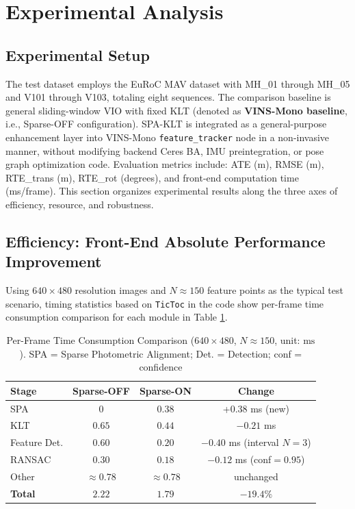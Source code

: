\documentclass[journal,twoside,web]{ieeecolor}
\begin{document}
\section{Experimental Analysis}
\label{sec:experiment}

\subsection{Experimental Setup}

The test dataset employs the EuRoC MAV dataset \cite{burri2016euroc} with MH\_01 through MH\_05 and V101 through V103, totaling eight sequences. The comparison baseline is general sliding-window VIO with fixed KLT (denoted as \textbf{VINS-Mono baseline}, i.e., Sparse-OFF configuration). SPA-KLT is integrated as a general-purpose enhancement layer into VINS-Mono \texttt{feature\_tracker} node in a non-invasive manner, without modifying backend Ceres BA, IMU preintegration, or pose graph optimization code. Evaluation metrics include: ATE (m), RMSE (m), RTE\_trans (m), RTE\_rot (degrees), and front-end computation time (ms/frame). This section organizes experimental results along the three axes of efficiency, resource, and robustness.

\subsection{Efficiency: Front-End Absolute Performance Improvement}

Using $640\times480$ resolution images and $N\approx150$ feature points as the typical test scenario, timing statistics based on \texttt{TicToc} in the code show per-frame time consumption comparison for each module in Table \ref{tab:time_breakdown}.

\begin{table}[!t]
\centering
\caption{Per-Frame Time Consumption Comparison ($640\times480$, $N\approx150$, unit: $\mathrm{ms}$). SPA = Sparse Photometric Alignment; Det. = Detection; conf = confidence}
\label{tab:time_breakdown}
\begin{tabular}{|l|c|c|c|}
\hline
Stage & \multicolumn{1}{c|}{Sparse-OFF} & \multicolumn{1}{c|}{Sparse-ON} & \multicolumn{1}{c|}{Change} \\
\hline
SPA & $0$ & $\mathbf{0.38}$ & +0.38 ms (new) \\
\hline
KLT & $\mathbf{0.65}$ & $\mathbf{0.44}$ & $-0.21$ ms \\
\hline
Feature Det. & $0.60$ & $0.20$ & $-0.40$ ms (interval $N=3$) \\
\hline
RANSAC & $\mathbf{0.30}$ & $\mathbf{0.18}$ & $-0.12$ ms (conf$=0.95$) \\
\hline
Other & $\approx 0.78$ & $\approx 0.78$ & unchanged \\
\hline
\textbf{Total} & $\mathbf{2.22}$ & $\mathbf{1.79}$ & $\mathbf{-19.4\%}$ \\
\hline
\end{tabular}
\end{table}
\end{document}
